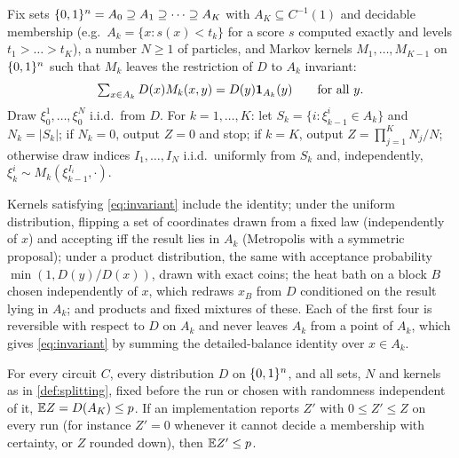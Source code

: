 \begin{definition}\label{def:splitting}
Fix sets $\{0,1\}^n=A_0\supseteq A_1\supseteq\dots\supseteq A_K$ with
$A_K\subseteq C^{-1}(1)$ and decidable membership (e.g.\ $A_k=\{x:s(x)<t_k\}$ for a
score $s$ computed exactly and levels $t_1>\dots>t_K$), a number $N\ge1$ of particles,
and Markov kernels $M_1,\dots,M_{K-1}$ on $\{0,1\}^n$ such that $M_k$ leaves the
restriction of $D$ to $A_k$ invariant:
\begin{equation}\label{eq:invariant}
\textstyle\sum_{x\in A_k}D(x)M_k(x,y)=D(y)\mathbf{1}_{A_k}(y)\qquad\text{for all }y.
\end{equation}
Draw $\xi_0^1,\dots,\xi_0^N$ i.i.d.\ from $D$. For $k=1,\dots,K$: let
$S_k=\{i:\xi_{k-1}^i\in A_k\}$ and $N_k=|S_k|$; if $N_k=0$, output $Z=0$ and stop; if
$k=K$, output $Z=\prod_{j=1}^KN_j/N$; otherwise draw indices $I_1,\dots,I_N$ i.i.d.\
uniformly from $S_k$ and, independently, $\xi_k^i\sim M_k(\xi_{k-1}^{I_i},\cdot)$.
\end{definition}

Kernels satisfying \eqref{eq:invariant} include the identity; under the uniform
distribution, flipping a set of coordinates drawn from a fixed law (independently of
$x$) and accepting iff the result lies in $A_k$ (Metropolis with a symmetric
proposal); under a product distribution, the same with acceptance probability
$\min(1,D(y)/D(x))$, drawn with exact coins; the heat bath on a block $B$ chosen
independently of $x$, which redraws $x_B$ from $D$ conditioned on the result lying in
$A_k$; and products and fixed mixtures of these. Each of the first four is reversible
with respect to $D$ on $A_k$ and never leaves $A_k$ from a point of $A_k$, which gives
\eqref{eq:invariant} by summing the detailed-balance identity over $x\in A_k$.

\begin{theorem}\label{thm:splitting}
For every circuit $C$, every distribution $D$ on $\{0,1\}^n$, and all sets, $N$ and kernels
as in \cref{def:splitting}, fixed before the run or chosen with randomness independent
of it, $\mathbb{E} Z=D(A_K)\le p$. If an implementation reports $Z'$ with $0\le Z'\le Z$ on
every run (for instance $Z'=0$ whenever it cannot decide a membership with
certainty, or $Z$ rounded down), then $\mathbb{E} Z'\le p$.
\end{theorem}

